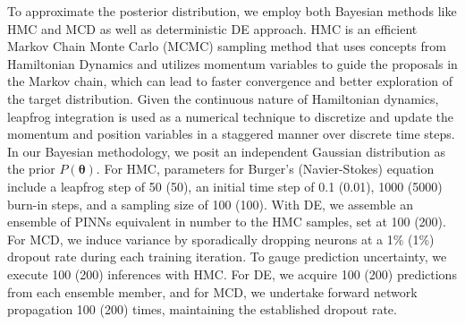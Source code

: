 \documentclass{article}
\begin{document}
\vspace{-0.15cm}
To approximate the posterior distribution, we employ both Bayesian methods like HMC and MCD as well as deterministic DE approach. HMC is an efficient Markov Chain Monte Carlo (MCMC) sampling method that uses concepts from Hamiltonian Dynamics and utilizes momentum variables to guide the proposals in the Markov chain, which can lead to faster convergence and better exploration of the target distribution. Given the continuous nature of Hamiltonian dynamics, leapfrog integration is used as a numerical technique to discretize and update the momentum and position variables in a staggered manner over discrete time steps. In our Bayesian methodology, we posit an independent Gaussian distribution as the prior $P(\mathbf{\theta})$. For HMC, parameters for Burger's (Navier-Stokes) equation include a leapfrog step of 50 (50), an initial time step of 0.1 (0.01), 1000 (5000) burn-in steps, and a sampling size of 100 (100). With DE, we assemble an ensemble of PINNs equivalent in number to the HMC samples, set at 100 (200). For MCD, we induce variance by sporadically dropping neurons at a 1\% (1\%) dropout rate during each training iteration. To gauge prediction uncertainty, we execute 100 (200) inferences with HMC. For DE, we acquire 100 (200) predictions from each ensemble member, and for MCD, we undertake forward network propagation 100 (200) times, maintaining the established dropout rate.
\end{document}
